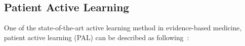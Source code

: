 \documentclass{svjour3}
\theoremstyle{break}
\begin{document}



\subsection{Patient Active Learning}
\label{sect: Patient Active Learning}

One of the state-of-the-art active learning method in evidence-based medicine, patient active learning (PAL) can be described as following~\cite{wallace2010semi}:
\end{document}
